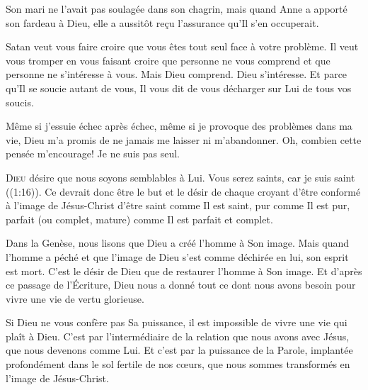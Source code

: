 
Son mari ne l'avait pas soulagée dans son chagrin,
 mais quand Anne a apporté son fardeau à Dieu,
 elle a aussitôt re\c{c}u l'assurance qu'Il s'en occuperait.

Satan veut vous faire croire que vous êtes tout seul face à votre problème.
 Il veut vous tromper en vous faisant croire que personne ne vous comprend
 et que personne ne s'intéresse à vous. Mais Dieu comprend. Dieu s'intéresse.
 Et parce qu'Il se soucie autant de vous, Il vous dit de vous décharger
 sur Lui de tous vos soucis.

Même si j'essuie échec après échec, même si je provoque des problèmes
 dans ma vie, Dieu m'a promis de ne jamais me laisser ni m'abandonner.
 Oh, combien cette pensée m'encourage! Je ne suis pas seul.

\dvrule






\lettrine{D}{ieu} désire que nous soyons semblables à Lui.
 \Og Vous serez saints, car je suis saint \Fg{} ((1:16)).
 Ce devrait donc être le but et le désir de chaque croyant d'être conformé
 à l'image de Jésus-Christ \ocadr d'être saint comme Il est saint,
 pur comme Il est pur, parfait (ou complet, mature)
 comme Il est parfait et complet.

Dans la Genèse, nous lisons que Dieu a créé l'homme à Son image.
 Mais quand l'homme a péché et que l'image de Dieu s'est comme déchirée en lui,
 son esprit est mort. C'est le désir de Dieu que de restaurer l'homme
 à Son image. Et d'après ce passage de l'Écriture,
 Dieu nous a donné tout ce dont nous avons besoin
 pour vivre une vie de vertu glorieuse.


Si Dieu ne vous confère pas Sa puissance, il est impossible de vivre une vie
 qui plaît à Dieu. C'est par l'intermédiaire de la relation que nous avons
 avec Jésus, que 
 nous devenons comme Lui. Et c'est par la puissance de la Parole,
 implantée profondément dans le sol fertile de nos c\oe{}urs,
 que nous sommes transformés en l'image de Jésus-Christ.

